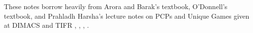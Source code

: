 \noindent These notes borrow heavily from Arora and Barak's textbook, O'Donnell's textbook, and Prahladh Harsha's lecture notes on PCPs and Unique Games given at DIMACS and TIFR \cite{arora2009computational},
\cite{harsha2010limitsTIFR}, \cite{harsha2010limitsDIMACS},
\cite{o2014analysis}.

